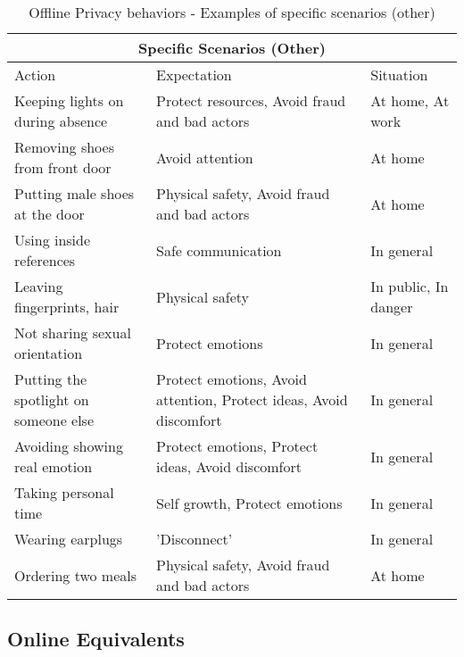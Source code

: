 \begin{table}[H]
    \centering
\begin{tabular}{ |p{5cm}||p{6cm}|p{4cm}|  }
\hline
\multicolumn{3}{|c|}{Specific Scenarios (Other)} \\
\hline
\hline
    Action & Expectation & Situation\\
\hline
\hline
    Keeping lights on during absence & Protect resources, Avoid fraud and bad actors & At home, At work \\
\hline    
    Removing shoes from front door & Avoid attention & At home \\
\hline      
    Putting male shoes at the door & Physical safety, Avoid fraud and bad actors & At home \\
\hline  
    Using inside references & Safe communication & In general \\
\hline      
    Leaving fingerprints, hair & Physical safety & In public, In danger \\
\hline      
    Not sharing sexual orientation & Protect emotions & In general \\
\hline      
    Putting the spotlight on someone else & Protect emotions, Avoid attention, Protect ideas, Avoid discomfort & In general \\
\hline      
    Avoiding showing real emotion & Protect emotions, Protect ideas, Avoid discomfort & In general \\
\hline      
    Taking personal time & Self growth, Protect emotions & In general \\
\hline      
    Wearing earplugs & 'Disconnect' & In general  \\
\hline      
    Ordering two meals & Physical safety, Avoid fraud and bad actors & At home \\
\hline      
\end{tabular}
\caption{Offline Privacy behaviors - Examples of specific scenarios (other)}
    \label{tab:meng_t1}
\end{table}

\subsection{Online Equivalents}
\label{online_behaviors}


